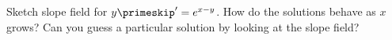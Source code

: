 {Sketch slope field for $y\primeskip'=e^{x-y}$.  How do the solutions behave as $x$
grows?  Can you guess a particular solution by looking at the slope
field?}
{
\begin{minipage}{\linewidth}
\end{minipage}
}